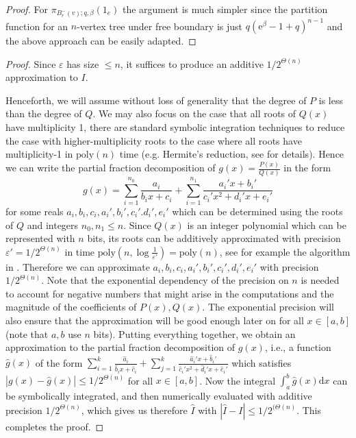\documentclass[11pt]{article}
\theoremstyle{plain}
\let\epsilon=\varepsilon
\newcommand{\emm}{\mathrm{e}}
\newcommand{\1}{\mathbb{1}}
\begin{document}
\begin{proof}
For $\pi_{B_r^{-}(v);q,\beta}(1_e)$ the argument is much simpler since the partition function for an $n$-vertex tree under free boundary is just $q(\emm^{\beta}-1+q)^{n-1}$ and the above approach can be easily adapted.
\end{proof}
\integrate*
\begin{proof}
Since $\epsilon$ has size $\leq n$, it suffices to produce an additive $1/2^{\Theta(n)}$ approximation to $I$.
 
 Henceforth, we will assume without loss of generality that the degree of $P$ is less than the degree of $Q$. We may also  focus on the case that all roots of $Q(x)$ have multiplicity 1, there are standard symbolic integration techniques to reduce the case with higher-multiplicity roots to the case where all roots have multiplicity-1 in $\text{poly}(n)$ time (e.g. Hermite's reduction, see \cite{integrate} for details). Hence we can write the   partial fraction decomposition of $g(x)=\frac{P(x)}{Q(x)}$ in the form 
 \[g(x)=\sum^{n_0}_{i=1} \frac{a_i}{b_i  x+c_i}+\sum^{n_1}_{i=1} \frac{a_i'x+b_i'}{c_i' x ^2+d_i' x +e_i'}\] for some reals $a_i,b_i,c_i,a_i',b_i',c_i'.d_i',e_i'$ which can be determined using the roots of $Q$ and integers $n_0,n_1\leq n$. Since $Q(x)$ is an integer polynomial which can be represented with $n$ bits,   its roots can be additively approximated with precision $\epsilon'=1/2^{\Theta(n)}$ in time $\text{poly}(n,\log \frac{1}{\epsilon'})=\text{poly}(n)$, see for example the algorithm in \cite{NEFF199681}. Therefore  we can approximate $a_i,b_i,c_i,a_i',b_i',c_i',d_i',e_i'$ with precision  $1/2^{\Theta(n)}$. Note that the exponential dependency of the precision on $n$ is needed to account for negative numbers that might arise in the computations and the magnitude of the coefficients of $P(x),Q(x)$.  The exponential precision will also ensure that the approximation will be good enough later on for all $x\in [a,b]$ (note that $a,b$ use $n$ bits). Putting everything together,  we  obtain an approximation to the partial fraction decomposition of $g(x)$, i.e., a function $\hat g(x)$ of the form $\sum^k_{i=1} \frac{\hat a_i}{\hat b_i x+\hat c_i}+\sum^k_{j=1} \frac{\hat a_i'x+\hat b_i'}{\hat c_i' x ^2+\hat d_i' x +\hat e_i'}$ which satisfies $|g(x)-\hat g(x)|\leq 1/2^{\Theta(n)}$ for all $x\in [a,b]$.  Now the integral $\int^{b}_{a}\hat g(x)\mathrm{d} x$ can be symbolically integrated, and then numerically evaluated with additive precision $1/2^{\Theta(n)}$, which gives us therefore $\hat{I}$ with $|\hat{I}-I|\leq 1/2^{(\Theta(n)}$. This completes the proof.
\end{proof}
\end{document}
